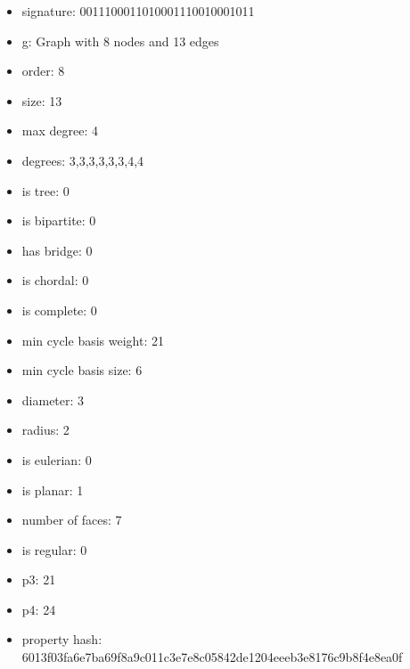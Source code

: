 \begin{itemize}
\item signature: 0011100011010001110010001011
\item g: Graph with 8 nodes and 13 edges
\item order: 8
\item size: 13
\item max degree: 4
\item degrees: 3,3,3,3,3,3,4,4
\item is tree: 0
\item is bipartite: 0
\item has bridge: 0
\item is chordal: 0
\item is complete: 0
\item min cycle basis weight: 21
\item min cycle basis size: 6
\item diameter: 3
\item radius: 2
\item is eulerian: 0
\item is planar: 1
\item number of faces: 7
\item is regular: 0
\item p3: 21
\item p4: 24
\item property hash: 6013f03fa6e7ba69f8a9c011c3e7e8c05842de1204eeeb3e8176c9b8f4e8ea0f
\end{itemize}
\newpage
\begin{figure}
\end{figure}
